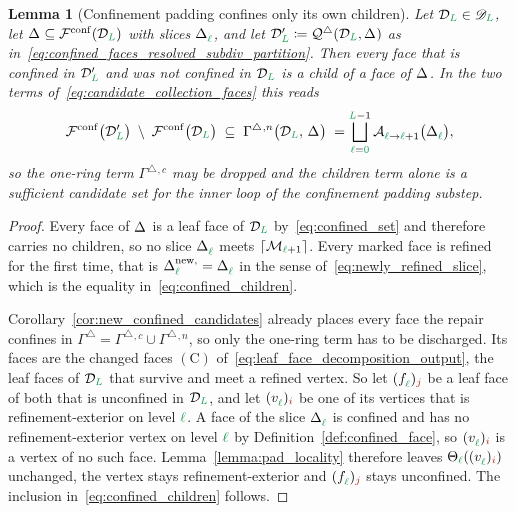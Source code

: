\documentclass[a4paper, 12pt]{article}
\makeatletter
\newcommand{\quadriF}{\mathcal{Q}^{\triangle}}                   %
\newcommand{\collectF}{\Gamma^{\triangle}}                       %
\newcommand{\green}{\color{ForestGreen}}
\newcommand{\brickred}{\color{BrickRed}}
\newcommand{\F}{\mathcal{F}}
\DeclareRobustCommand{\simplexsubsetTwo}[2][]{\Delta\ifx\@empty#1\@empty\else^{#1}\fi_{#2}}
\DeclareRobustCommand{\simplexsubsetNew}[2][]{\Delta^{\mathrm{new}\ifx\@empty#1\@empty\else,#1\fi}_{#2}}
\newcommand{\vertex}[2]{\freeQ{v}{}{#1}{#2}}
\newcommand{\face}[2]{\freeQ{f}{}{#1}{#2}}
\newcommand{\coarseIdxone}{{\brickred i}}
\newcommand{\fineIdxone}{{\brickred j}}
\renewcommand{\l}{{\green\ell}}
\renewcommand{\L}{{\green L}}
\newcommand{\lzero}{{\green 0}}
\newcommand{\freeQ}[4]{ ( {#1}^{#2}_{#3} )_{#4}}
\newcommand{\Aop}[3]{\mathcal{A}^{#1}_{{#2} \to {#3}}}
\newcommand{\M}{\mathcal{M}}
\newtheorem{lemma}[theorem]{Lemma}
\theoremstyle{definition}
\theoremstyle{plain}
\numberwithin{equation}{section}
\newcommand{\ancestorPatch}[1]{\lceil #1 \rceil}
\DeclareRobustCommand{\domseq}[1][]{\mathcal{D}\ifx\@empty#1\@empty\else_{#1}\fi}
\newcommand{\alldomseqs}{\mathscr{D}}
\newcommand{\refFan}[1]{\Theta_{#1}}                        %
\makeatother
\begin{document}
\begin{lemma}[Confinement padding confines only its own children]
    \label{lemma:confined_children}
    Let $\domseq[\L] \in \alldomseqs_\L$, let $\simplexsubsetTwo{} \subseteq \F^{\mathrm{conf}}(\domseq[\L])$ with slices $\simplexsubsetTwo{\l}$, and let $\domseq[\L]' \coloneq \quadriF(\domseq[\L], \simplexsubsetTwo{})$ as in~\eqref{eq:confined_faces_resolved_subdiv_partition}. Then every face that is confined in $\domseq[\L]'$ and was not confined in $\domseq[\L]$ is a child of a face of $\simplexsubsetTwo{}$. In the two terms of~\eqref{eq:candidate_collection_faces} this reads
    \begin{equation}
        \label{eq:confined_children}
        \F^{\mathrm{conf}} \big( \domseq[\L]' \big) \; \setminus \; \F^{\mathrm{conf}} \big( \domseq[\L] \big) \; \subseteq \; \collectF{}^{,n} \big( \domseq[\L], \, \simplexsubsetTwo{} \big) \; = \bigsqcup\limits_{\l = \lzero}^{\L-1} \Aop{}{\l}{\l+1} \big( \simplexsubsetTwo{\l} \big) ,
    \end{equation}
    so the one-ring term $\collectF{}^{,c}$ may be dropped and the children term alone is a sufficient candidate set for the inner loop of the confinement padding substep.
\end{lemma}
\begin{proof}
    Every face of $\simplexsubsetTwo{}$ is a leaf face of $\domseq[\L]$ by~\eqref{eq:confined_set} and therefore carries no children, so no slice $\simplexsubsetTwo{\l}$ meets $\ancestorPatch{\M_{\l+1}}$. Every marked face is refined for the first time, that is $\simplexsubsetNew{\l} = \simplexsubsetTwo{\l}$ in the sense of~\eqref{eq:newly_refined_slice}, which is the equality in~\eqref{eq:confined_children}.

    Corollary~\ref{cor:new_confined_candidates} already places every face the repair confines in $\collectF{} = \collectF{}^{,c} \cup \collectF{}^{,n}$, so only the one-ring term has to be discharged. Its faces are the changed faces $(\mathrm{C})$ of~\eqref{eq:leaf_face_decomposition_output}, the leaf faces of $\domseq[\L]$ that survive and meet a refined vertex. So let $\face{\l}{\fineIdxone}$ be a leaf face of both that is unconfined in $\domseq[\L]$, and let $\vertex{\l}{\coarseIdxone}$ be one of its vertices that is refinement-exterior on level $\l$. A face of the slice $\simplexsubsetTwo{\l}$ is confined and has no refinement-exterior vertex on level $\l$ by Definition~\ref{def:confined_face}, so $\vertex{\l}{\coarseIdxone}$ is a vertex of no such face. Lemma~\ref{lemma:pad_locality} therefore leaves $\refFan{\l}(\vertex{\l}{\coarseIdxone})$ unchanged, the vertex stays refinement-exterior and $\face{\l}{\fineIdxone}$ stays unconfined. The inclusion in~\eqref{eq:confined_children} follows.
\end{proof}
\end{document}
